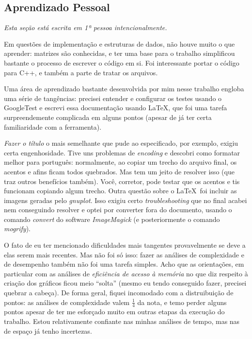 \documentclass{article}
\begin{document}
\subsection{Aprendizado Pessoal}

\textit{Esta seção está escrita em 1ª pessoa intencionalmente.}

Em questões de implementação e estruturas de dados, não houve muito o que aprender: matrizes são conhecidas, e ter uma base para o trabalho simplificou bastante o processo de escrever o código em si. Foi interessante portar o código para C++, e também a parte de tratar os arquivos.

Uma área de aprendizado bastante desenvolvida por mim nesse trabalho engloba uma série de tangências: precisei entender e configurar os testes usando o GoogleTest e escrevi essa documentação usando \LaTeX, que foi uma tarefa surpreendemente complicada em alguns pontos (apesar de já ter certa familiaridade com a ferramenta). 

\textit{Fazer o título} o mais semelhante que pude ao especificado, por exemplo, exigiu certa engenhosidade. Tive uns problemas de \textit{encoding} e descobri como formatar melhor para português: normalmente, ao copiar um trecho do arquivo final, os acentos e afins ficam todos quebrados. Mas tem um jeito de resolver isso (que traz outros benefícios também). Você, corretor, pode testar que os acentos e tis funcionam copiando algum trecho. Outra questão sobre o \LaTeX\  foi incluir as imagens geradas pelo \textit{gnuplot}. Isso exigiu certo \textit{troubleshooting} que no final acabei nem conseguindo resolver e optei por converter fora do documento, usando o comando \textit{convert} do software \textit{ImageMagick} (e posteriormente o comando \textit{mogrify}).

O fato de eu ter mencionado dificuldades mais tangentes provavelmente se deve a elas serem mais recentes. Mas não foi só isso: fazer as análises de complexidade e de desempenho também não foi uma tarefa simples. Acho que as orientações, em particular com as análises de \textit{eficiência de acesso à memória} no que diz respeito à criação dos gráficos ficou meio ``solta'' (mesmo eu tendo conseguido fazer, precisei quebrar a cabeça). De forma geral, fiquei incomodado com a distruibuição de pontos: as análises de complexidade valem \( \frac{1}{4} \) da nota, e temo perder alguns pontos apesar de ter me esforçado muito em outras etapas da execução do trabalho. Estou relativamente confiante nas minhas análises de tempo, mas nas de espaço já tenho incertezas.
\end{document}
